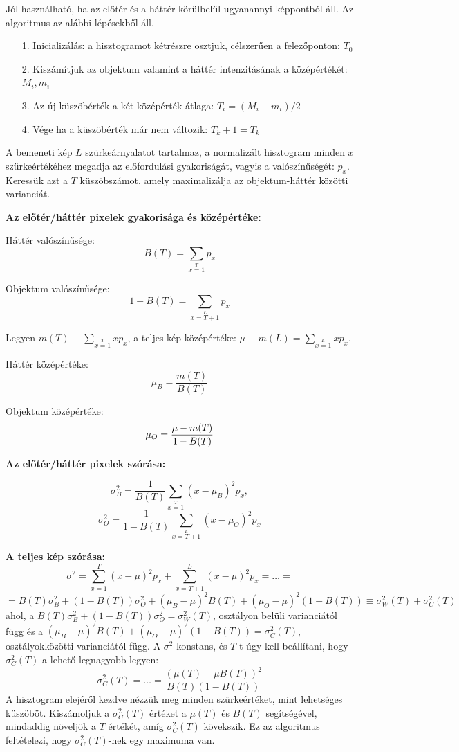

Jól használható, ha az előtér és a háttér körülbelül ugyanannyi képpontból áll. Az algoritmus az alábbi lépésekből áll.
\begin{itemize}
\item[1.] Inicializálás: a hisztogramot kétrészre osztjuk, célszerűen a felezőponton: $T_0$
\item[2.] Kiszámítjuk az objektum valamint a háttér intenzitásának a középértékét: $M_i, m_i$
\item[3.] Az új küszöbérték a két középérték átlaga: $T_i=(M_i+m_i)/2$
\item[4.] Vége ha a küszöbérték már nem változik: $T_k+1=T_k$
\end{itemize}



A bemeneti kép $L$ szürkeárnyalatot tartalmaz, a normalizált hisztogram minden $x$ szürkeértékéhez megadja az előfordulási gyakoriságát, vagyis a valószínűségét: $p_x$. Keressük azt a $T$ küszöbszámot, amely maximalizálja az objektum-háttér közötti varianciát.

\textbf{Az előtér/háttér pixelek gyakorisága és középértéke:}

Háttér valószínűsége:
$$
B(T) = \sum\limits_{x=1}\limits^{T}p_x 
$$

Objektum valószínűsége:
$$
1-B(T)=\sum\limits_{x=T+1}\limits^{L}p_x
$$

Legyen $m(T)\equiv \sum\limits_{x=1}\limits^{T}xp_x$, a teljes kép középértéke: $\mu \equiv m(L) = \sum\limits_{x=1}\limits^{L}xp_x$,

Háttér középértéke:
$$
\mu_B =\frac{m(T)}{B(T)}
$$

Objektum középértéke:
$$
\mu_O =\frac{\mu-m(T)}{1-B(T)}\\
$$

\textbf{Az előtér/háttér pixelek szórása:}

$$
\sigma^2_B =
\frac{1}{B(T)}\sum\limits_{x=1}\limits^{T}(x-\mu_B)^2 p_x,
$$
$$
\sigma^2_O =
\frac{1}{1-B(T)}\sum\limits_{x=T+1}\limits^{L}(x-\mu_O)^2 p_x
$$

\textbf{A teljes kép szórása:}
$$
\sigma^2 =
\sum_{x=1}^T(x-\mu)^2 p_x + \sum_{x=T+1}^L(x-\mu)^2 p_x =
\dots =
$$
$$
= B(T)\sigma_B^2+(1-B(T))\sigma_O^2 + (\mu_B-\mu)^2B(T)+(\mu_O-\mu)^2(1-B(T)) \equiv \sigma^2_W(T)+\sigma^2_C(T)
$$
ahol, a $B(T)\sigma_B^2+(1-B(T))\sigma_O^2 = \sigma^2_W(T)$, osztályon belüli varianciától függ és a $(\mu_B-\mu)^2B(T)+(\mu_O-\mu)^2(1-B(T)) = \sigma^2_C(T)$, osztályokközötti varianciától függ. A $\sigma^2$ konstans, és $T$-t úgy kell beállítani, hogy $\sigma_C^2(T)$ a lehető legnagyobb legyen:
$$
\sigma^2_C(T) = \dots = \frac{(\mu(T)-\mu B(T))^2}{B(T)(1-B(T))}
$$
A hisztogram elejéről kezdve nézzük meg minden szürkeértéket, mint lehetséges küszöböt. Kiszámoljuk a $\sigma^2_C(T)$ értéket a $\mu(T)$ és $B(T)$  segítségével, mindaddig növeljök a $T$ értékét, amíg $\sigma^2_C(T)$ kövekszik. Ez az algoritmus feltételezi, hogy $\sigma^2_C(T)$-nek egy maximuma van.

